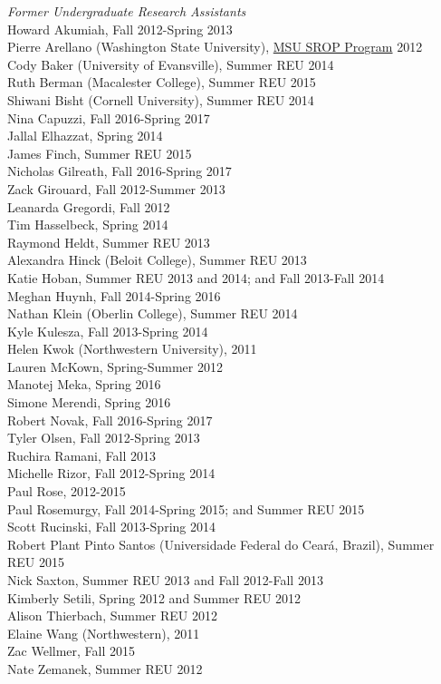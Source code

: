\documentclass[9pt]{extarticle}
\begin{document}
\emph{Former Undergraduate Research Assistants} \\
Howard Akumiah, Fall 2012-Spring 2013 \\
Pierre Arellano (Washington State University), \href{http://grad.msu.edu/srop/}{MSU SROP Program} 2012 \\
Cody Baker (University of Evansville), Summer REU 2014 \\
Ruth Berman (Macalester College), Summer REU 2015 \\
Shiwani Bisht (Cornell University), Summer REU 2014 \\
Nina Capuzzi, Fall 2016-Spring 2017 \\
Jallal Elhazzat, Spring 2014 \\
James Finch, Summer REU 2015 \\
Nicholas Gilreath, Fall 2016-Spring 2017 \\
Zack Girouard, Fall 2012-Summer 2013 \\
Leanarda Gregordi, Fall 2012 \\
Tim Hasselbeck, Spring 2014 \\
Raymond Heldt, Summer REU 2013 \\
Alexandra Hinck (Beloit College), Summer REU 2013 \\
Katie Hoban, Summer REU 2013 and 2014; and Fall 2013-Fall 2014 \\
Meghan Huynh, Fall 2014-Spring 2016 \\
Nathan Klein (Oberlin College), Summer REU 2014 \\
Kyle Kulesza, Fall 2013-Spring 2014 \\
Helen Kwok (Northwestern University), 2011 \\
Lauren McKown, Spring-Summer 2012 \\
Manotej Meka, Spring 2016 \\
Simone Merendi, Spring 2016 \\
Robert Novak, Fall 2016-Spring 2017 \\
Tyler Olsen, Fall 2012-Spring 2013 \\
Ruchira Ramani, Fall 2013 \\
Michelle Rizor, Fall 2012-Spring 2014 \\
Paul Rose, 2012-2015 \\
Paul Rosemurgy, Fall 2014-Spring 2015; and Summer REU 2015 \\
Scott Rucinski, Fall 2013-Spring 2014 \\
Robert Plant Pinto Santos (Universidade Federal do Cear\'{a}, Brazil), Summer REU 2015 \\
Nick Saxton, Summer REU 2013 and Fall 2012-Fall 2013 \\
Kimberly Setili, Spring 2012 and Summer REU 2012 \\
Alison Thierbach, Summer REU 2012 \\
Elaine Wang (Northwestern), 2011 \\
Zac Wellmer, Fall 2015 \\
Nate Zemanek, Summer REU 2012 \\
\end{document}
